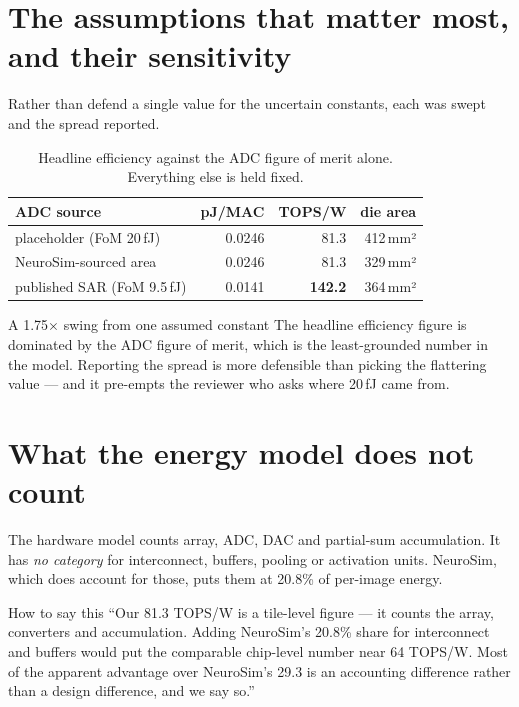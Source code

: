 \documentclass[11pt,a4paper]{report}
\begin{document}
\section{The assumptions that matter most, and their sensitivity}

Rather than defend a single value for the uncertain constants, each was swept
and the spread reported.

\begin{table}[h]
\centering
\caption{Headline efficiency against the ADC figure of merit alone. Everything
else is held fixed.}
\begin{tabular}{lrrr}
\toprule
ADC source & pJ/MAC & TOPS/W & die area \\
\midrule
placeholder (FoM 20\,fJ) & 0.0246 & 81.3 & 412\,mm² \\
NeuroSim-sourced area & 0.0246 & 81.3 & 329\,mm² \\
published SAR (FoM 9.5\,fJ) & 0.0141 & \textbf{142.2} & 364\,mm² \\
\bottomrule
\end{tabular}
\end{table}

\begin{warnbox}{A 1.75$\times$ swing from one assumed constant}
The headline efficiency figure is dominated by the ADC figure of merit, which
is the least-grounded number in the model. Reporting the spread is more
defensible than picking the flattering value --- and it pre-empts the reviewer
who asks where 20\,fJ came from.
\end{warnbox}

\section{What the energy model does not count}

The hardware model counts array, ADC, DAC and partial-sum accumulation. It has
\emph{no category} for interconnect, buffers, pooling or activation units.
NeuroSim, which does account for those, puts them at 20.8\% of per-image
energy.

\begin{saybox}{How to say this}
``Our 81.3 TOPS/W is a tile-level figure --- it counts the array, converters
and accumulation. Adding NeuroSim's 20.8\% share for interconnect and buffers
would put the comparable chip-level number near 64 TOPS/W. Most of the
apparent advantage over NeuroSim's 29.3 is an accounting difference rather
than a design difference, and we say so.''
\end{saybox}
\end{document}
